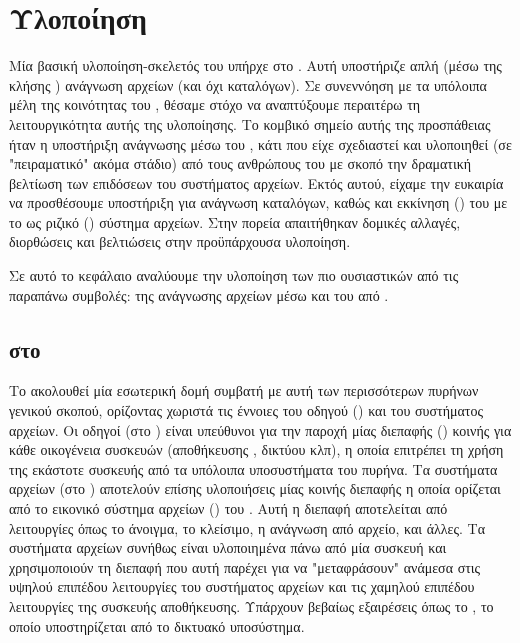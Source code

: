 \chapter{Υλοποίηση}

Μία βασική υλοποίηση-σκελετός του \viofs{} υπήρχε στο \osv{}. %
Αυτή υποστήριζε
απλή (μέσω της κλήσης ) ανάγνωση αρχείων (και όχι καταλόγων).
Σε συνεννόηση με τα υπόλοιπα μέλη της κοινότητας του \osv{}, θέσαμε στόχο να
αναπτύξουμε περαιτέρω τη λειτουργικότητα αυτής της υλοποίησης. Το κομβικό
σημείο αυτής της προσπάθειας ήταν η υποστήριξη ανάγνωσης μέσω του \viofs{}
, κάτι που είχε σχεδιαστεί και υλοποιηθεί (σε "πειραματικό" ακόμα
στάδιο) από τους ανθρώπους του \viofs{} με σκοπό την δραματική βελτίωση των
επιδόσεων του συστήματος αρχείων. Εκτός αυτού, είχαμε την ευκαιρία να
προσθέσουμε υποστήριξη για ανάγνωση καταλόγων, καθώς και εκκίνηση ()
του \osv{} με το \viofs{} ως ριζικό () σύστημα αρχείων. Στην πορεία
απαιτήθηκαν δομικές αλλαγές, διορθώσεις και βελτιώσεις στην προϋπάρχουσα
υλοποίηση.

Σε αυτό το κεφάλαιο αναλύουμε την υλοποίηση των πιο ουσιαστικών από τις παραπάνω
συμβολές: της ανάγνωσης αρχείων μέσω  και του  από
\viofs{}.

\section{ στο \viofs{}}

Το \osv{} ακολουθεί μία εσωτερική δομή συμβατή με αυτή των περισσότερων πυρήνων
γενικού σκοπού, ορίζοντας χωριστά τις έννοιες του οδηγού () και του
συστήματος αρχείων. Οι οδηγοί (στο ) είναι υπεύθυνοι για
την παροχή μίας διεπαφής () κοινής για κάθε οικογένεια συσκευών
(αποθήκευσης , δικτύου κλπ), η οποία επιτρέπει τη χρήση της εκάστοτε
συσκευής από τα υπόλοιπα υποσυστήματα του πυρήνα. Τα συστήματα αρχείων (στο
) αποτελούν επίσης υλοποιήσεις μίας κοινής διεπαφής η οποία ορίζεται από
το εικονικό σύστημα αρχείων () του \osv{}. Αυτή η
διεπαφή αποτελείται από λειτουργίες όπως το άνοιγμα, το κλείσιμο, η ανάγνωση από
αρχείο, και άλλες. Τα συστήματα αρχείων συνήθως είναι υλοποιημένα πάνω από μία
συσκευή  και χρησιμοποιούν τη διεπαφή που αυτή παρέχει για να
"μεταφράσουν" ανάμεσα στις υψηλού επιπέδου λειτουργίες του συστήματος αρχείων
και τις χαμηλού επιπέδου λειτουργίες της συσκευής αποθήκευσης. Υπάρχουν βεβαίως
εξαιρέσεις όπως το , το οποίο υποστηρίζεται από το δικτυακό υποσύστημα.

